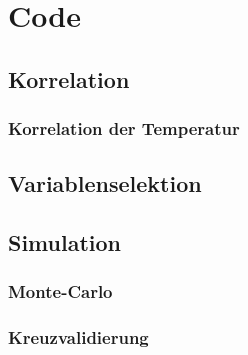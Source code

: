 \section{Code}

\subsection{Korrelation}


\subsubsection{Korrelation der Temperatur}


\subsection{Variablenselektion}


\subsection{Simulation}
\subsubsection{Monte-Carlo}

\subsubsection{Kreuzvalidierung}
